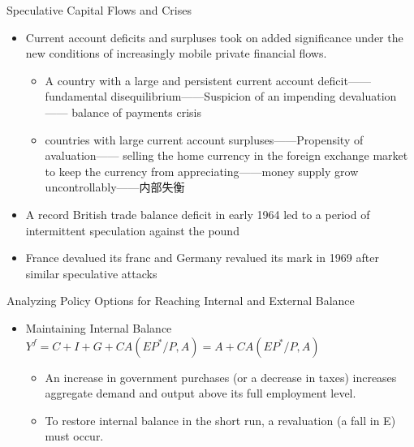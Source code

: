 \documentclass[10pt,hyperref={CJKbookmarks=true},xcolor=dvipsnames,aspectratio=169]{beamer}
\begin{document}
\begin{frame}{Speculative Capital Flows and Crises}
\begin{itemize}
	\item Current account deficits and surpluses took on added significance under the new
	conditions of increasingly mobile private financial flows.
	\begin{itemize}
		\item A country with a large
		and persistent current account deficit——fundamental disequilibrium——Suspicion of an impending devaluation—— balance of
		payments crisis
		\item countries with large current account surpluses——Propensity of avaluation—— selling the home currency in the
		foreign exchange market to keep the currency from appreciating——money supply grow uncontrollably——内部失衡
	\end{itemize}
	\item 	A record British trade balance deficit in early
	1964 led to a period of intermittent speculation against the pound 
	\item France devalued its franc and Germany revalued its mark in 1969 after similar speculative attacks
\end{itemize}
\end{frame}

\begin{frame}{Analyzing Policy Options for Reaching
	Internal and External Balance}
	\begin{itemize}
		\item Maintaining Internal Balance
		$Y^{f} = C + I + G + CA(EP^{*}/P, A) = A + CA(EP^{*}/P, A)$
		\begin{itemize}
			\item An increase in government purchases (or a
			decrease in taxes) increases aggregate demand
			and output above its full employment level.
			\item To restore internal balance in the short run, a
			revaluation (a fall in E) must occur.
		\end{itemize}
	\end{itemize}
\end{frame}
\end{document}
